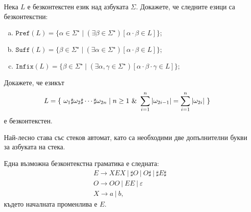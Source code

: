 \begin{problem}
  Нека $L$ е безконтекстен език над азбуката $\Sigma$.
  Докажете, че следните езици са безконтекстни:
  \begin{enumerate}[a)]
  \item 
    $\texttt{Pref}(L) = \{\alpha \in \Sigma^\star \mid (\exists \beta \in \Sigma^\star)[\alpha\cdot\beta \in L]\}$;
  \item 
    $\texttt{Suff}(L) = \{\beta \in \Sigma^\star \mid (\exists \alpha \in \Sigma^\star)[\alpha\cdot\beta \in L]\}$;
  \item
    $\texttt{Infix}(L) = \{\beta \in \Sigma^\star \mid (\exists \alpha,\gamma \in \Sigma^\star)[\alpha \cdot \beta \cdot \gamma \in L]\}$;
  \end{enumerate}
\end{problem}

\begin{problem}
  Докажете, че езикът
  \[L = \{\ \omega_1 \sharp \omega_2 \sharp \cdots \sharp \omega_{2n} \mid n \geq 1\ \&\ \sum^n_{i=1}\abs{\omega_{2i-1}} = \sum^{n}_{i=1}\abs{\omega_{2i}}\ \}\]
  е безконтекстен.
\end{problem}
\begin{hint}
  Най-лесно става със стеков автомат, като са необходими две допълнителни букви за азбуката на стека.

  Една възможна безконтекстна граматика е следната:
  \begin{align*}
    & E \to XEX\ |\ \sharp O\ |\ O\sharp\ |\ \sharp E\sharp\\
    & O \to OO\ |\ EE\ |\ \varepsilon\\
    & X \to a\ |\ b,
  \end{align*}
  където началната променлива е $E$.
\end{hint}


